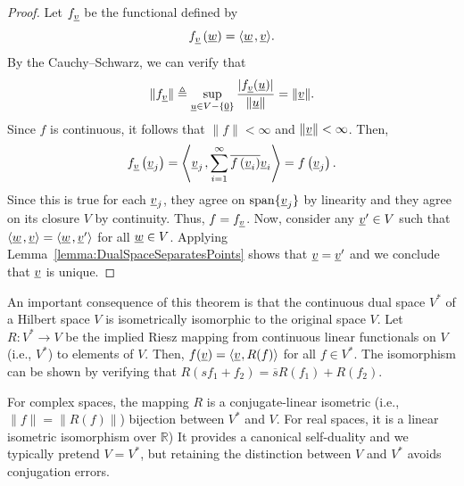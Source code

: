 \begin{proof}
Let $f_{\underline{v}}$ be the functional defined by
\begin{equation*}
f_{\underline{v}} \left( \underline{w} \right) = {\left\langle  \underline{w}  \mskip2mu ,  \underline{v}  \right\rangle} .
\end{equation*}
By the Cauchy--Schwarz, we can verify that
\[ \| f_{\underline{v}} \| \triangleq \sup_{\underline{u}\in V - \{ \underline{0} \}} \frac{|f_{\underline{v}} (\underline{u})|}{\| \underline{u} \|} = \| \underline{v} \|. \]
Since $f$ is continuous, it follows that $\| f \| < \infty$ and $\| \underline{v} \| < \infty$.
Then, 
\begin{equation*}
f_{\underline{v}} \left( \underline{v}_j \right) = {\left\langle  \underline{v}_j  \mskip2mu ,  \sum_{i=1}^\infty \overline{f \left( \underline{v}_i \right)} \underline{v}_i  \right\rangle}
= f \left( \underline{v}_j \right) .
\end{equation*}
Since this is true for each $\underline{v}_j$, they agree on $\mathrm{span}\{\underline v_j\}$ by linearity and they agree on its closure $V$ by continuity.
Thus, $f = f_{\underline{v}}$.
Now, consider any $\underline{v}' \in V$ such that ${\left\langle  \underline{w}  \mskip2mu ,  \underline{v}  \right\rangle} = {\left\langle  \underline{w}  \mskip2mu ,  \underline{v}'  \right\rangle}$ for all $\underline{w} \in V$.
Applying Lemma~\ref{lemma:DualSpaceSeparatesPoints} shows that $\underline{v} = \underline{v}'$ and we conclude that $\underline{v}$ is unique.
\end{proof}

An important consequence of this theorem is that the continuous dual space $V^*$ of a Hilbert space $V$ is isometrically isomorphic to the original space $V$.
Let $R \colon V^* \rightarrow V$ be the implied Riesz mapping from continuous linear functionals on $V$ (i.e., $V^*$) to elements of $V$.
Then, $f(\underline{v}) = {\langle  \underline{v}  \mskip1mu ,  R( f )  \rangle}$ for all $f \in V^*$.
The isomorphism can be shown by verifying that $R( s f_1 + f_2 ) = \overline{s} R(f_1) + R(f_2)$.

For complex spaces, the mapping $R$ is a conjugate-linear isometric (i.e., $\| f \| = \| R(f) \|$) bijection between $V^*$ and $V$.
For real spaces, it is a linear isometric isomorphism over $\mathbb R$)
It provides a canonical self-duality and we typically pretend $V=V^*$, but retaining the distinction between $V$ and $V^*$ avoids conjugation errors.

